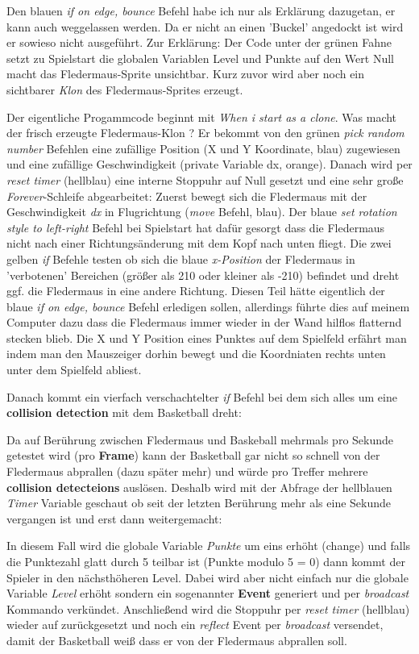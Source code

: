 \documentclass[10pt,a4paper,ngerman,twoside]{article} %
\begin{document}
Den blauen \textit{if on edge, bounce} Befehl habe ich nur als Erklärung dazugetan, er kann auch weggelassen werden. Da er nicht an einen 'Buckel' angedockt ist wird er sowieso nicht ausgeführt. Zur Erklärung: Der Code unter der grünen Fahne setzt zu Spielstart die globalen Variablen Level und Punkte auf den Wert Null macht das Fledermaus-Sprite unsichtbar. Kurz zuvor wird aber noch ein sichtbarer \textit{Klon} des Fledermaus-Sprites erzeugt. 

Der eigentliche Progammcode beginnt mit \textit{When i start as a clone}. Was macht der frisch erzeugte Fledermaus-Klon ? Er bekommt von den grünen \textit{pick random number} Befehlen eine zufällige Position (X und Y Koordinate, blau) zugewiesen und eine zufällige Geschwindigkeit (private Variable dx, orange). Danach wird per \textit{reset timer} (hellblau) eine interne Stoppuhr auf Null gesetzt und eine sehr große \textit{Forever}-Schleife abgearbeitet: Zuerst bewegt sich die Fledermaus mit der Geschwindigkeit \textit{dx} in Flugrichtung (\textit{move} Befehl, blau). Der blaue \textit{set rotation style to left-right} Befehl bei Spielstart hat dafür gesorgt dass die Fledermaus nicht nach einer Richtungsänderung mit dem Kopf nach unten fliegt. Die zwei gelben \textit{if} Befehle testen ob sich die blaue \textit{x-Position} der Fledermaus in 'verbotenen' Bereichen (größer als 210 oder kleiner als -210) befindet und dreht ggf. die Fledermaus in eine andere Richtung. Diesen Teil hätte eigentlich der blaue \textit{if on edge, bounce} Befehl erledigen sollen, allerdings führte dies auf meinem Computer dazu dass die Fledermaus immer wieder in der Wand hilflos flatternd stecken blieb. Die X und Y Position eines Punktes auf dem Spielfeld erfährt man indem man den Mauszeiger dorhin bewegt und die Koordniaten rechts unten unter dem Spielfeld abliest.

Danach kommt ein vierfach verschachtelter \textit{if} Befehl bei dem sich alles um eine \textbf{collision detection} mit dem Basketball dreht:

Da auf Berührung zwischen Fledermaus und Baskeball mehrmals pro Sekunde getestet wird (pro \textbf{Frame}) kann der Basketball gar nicht so schnell von der Fledermaus abprallen (dazu später mehr) und würde pro Treffer mehrere \textbf{collision detecteions} auslösen. Deshalb wird mit der Abfrage der hellblauen \textit{Timer} Variable geschaut ob seit der letzten Berührung mehr als eine Sekunde vergangen ist und erst dann weitergemacht:

In diesem Fall wird die globale Variable \textit{Punkte} um eins erhöht (change) und falls die Punktezahl glatt durch 5 teilbar ist (Punkte modulo 5 = 0) dann kommt der Spieler in den nächsthöheren Level. Dabei wird aber nicht einfach nur die globale Variable \textit{Level} erhöht sondern ein sogenannter \textbf{Event} generiert und per \textit{broadcast} Kommando verkündet. Anschließend wird die Stoppuhr per \textit{reset timer} (hellblau) wieder auf zurückgesetzt und noch ein \textit{reflect} Event per \textit{broadcast} versendet, damit der Basketball weiß dass er von der Fledermaus abprallen soll.
\end{document}
